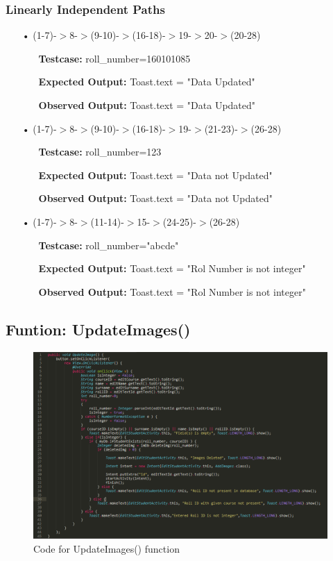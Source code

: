 \documentclass{scrreprt}
\begin{document}
\subsubsection{Linearly Independent Paths}
\begin{enumerate}
\item[•](1-7)-$>$8-$>$(9-10)-$>$(16-18)-$>$19-$>$20-$>$(20-28)
\begin{itemize}
\item[]\textbf{Testcase: }roll_number=160101085
\item[]\textbf{Expected Output: }Toast.text = "Data Updated"
\item[]\textbf{Observed Output: }Toast.text = "Data Updated"
\end{itemize}

\item[•](1-7)-$>$8-$>$(9-10)-$>$(16-18)-$>$19-$>$(21-23)-$>$(26-28)
\begin{itemize}
\item[]\textbf{Testcase: }roll_number=123
\item[]\textbf{Expected Output: }Toast.text = "Data not Updated"
\item[]\textbf{Observed Output: }Toast.text = "Data not Updated"
\end{itemize}

\item[•](1-7)-$>$8-$>$(11-14)-$>$15-$>$(24-25)-$>$(26-28)
\begin{itemize}
\item[]\textbf{Testcase: }roll_number="abcde"
\item[]\textbf{Expected Output: }Toast.text = "Rol Number is not integer"
\item[]\textbf{Observed Output: }Toast.text = "Rol Number is not integer"
\end{itemize}

\end{enumerate}	

\subsection{Funtion: UpdateImages()}
\begin{figure}[H]
\centering
\includegraphics[width=\textwidth, keepaspectratio]{updateImagesCode.png}
\caption{Code for UpdateImages() function}
\end{figure}
\end{document}
